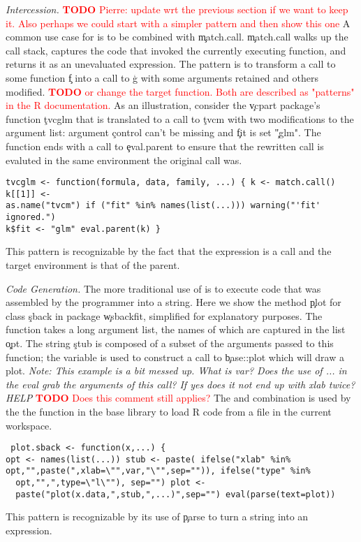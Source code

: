 \documentclass[screen,acmsmall]{acmart}
\newcommand{\mypara}[1]{\medskip\noindent\emph{#1}\xspace}
\newcommand{\NOTE}[1]{{\it Note: #1}\xspace}
\newcommand{\authorcomment}[3]{\xspace\textcolor{#1}{{\bf #2} #3}\xspace}
\newcommand{\todo}[1]{\authorcomment{red}{TODO}{#1}}
\begin{document}
\mypara{Intercession.} \todo{Pierre: update wrt the previous section if we want
to keep it. Also perhaps we could start with a simpler pattern and then show
this one} A common use case for \eval is to be combined with \c{match.call}.
\c{match.call} walks up the call stack, captures the code that invoked the
currently executing function, and returns it as an unevaluated expression. The
pattern is to transform a call to some function \c{f} into a call to \c{g} with
some arguments retained and others modified.  \todo{or change the target
function. Both are described as "patterns" in the R documentation.} As an
illustration, consider the \c{vcpart} package's function \c{tvcglm} that is
translated to a call to \c{tvcm} with two modifications to the argument list:
argument \c{control} can't be missing and \c{fit} is set \c{"glm"}. The
function ends with a call to \c{eval.parent} to ensure that the rewritten call
is evaluted in the same environment the original call was.  \begin{lstlisting}
tvcglm <- function(formula, data, family, ...) { k <- match.call() k[[1]] <-
as.name("tvcm") if ("fit" %in% names(list(...))) warning("'fit' ignored.")
k$fit <- "glm" eval.parent(k) } \end{lstlisting} This pattern is recognizable
by the fact that the expression is a call and the target environment is that of
the parent.

\mypara{Code Generation.} The more traditional use of \eval is to execute code
that was assembled by the programmer into a string. Here we show the method
\c{plot} for class \c{sback} in package \c{wsbackfit}, simplified for
explanatory purposes. The function takes a long argument list, the names of
which are captured in the list \c{opt}. The string \c{stub} is composed of a
subset of the arguments passed to this function; the variable is used to
construct a call to \c{base::plot} which will draw a plot. \NOTE{This example
  is a bit messed up. What is var? Does the use of ... in the eval grab the
arguments of this call? If yes does it not end up with xlab twice? HELP}
\todo{Does this comment still applies?} The \parse and \eval combination is
used by the the \source function in the base library to load R code from a file
in the current workspace.  \begin{lstlisting} plot.sback <- function(x,...) {
opt <- names(list(...)) stub <- paste( ifelse("xlab" %in%
opt,"",paste(",xlab=\"",var,"\"",sep="")), ifelse("type" %in%
  opt,"",",type=\"l\""), sep="") plot <-
  paste("plot(x.data,",stub,",...)",sep="") eval(parse(text=plot))
  \end{lstlisting} This pattern is recognizable by its use of \c{parse} to turn
  a string into an expression.
\end{document}
